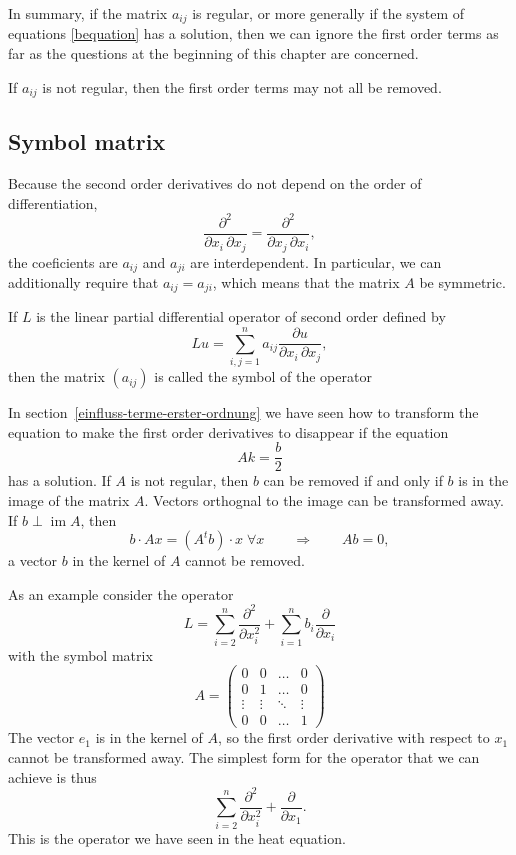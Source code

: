 In summary, if the matrix $a_{ij}$ is regular, or more generally if the
system of equations \eqref{bequation} has a solution, then we can
ignore the first order terms as far as the questions at the beginning
of this chapter are concerned.

If $a_{ij}$ is not regular, then the first order terms may not all
be removed.

\subsection{Symbol matrix}
Because the second order derivatives do not depend on the order
of differentiation,
\[
\frac{\partial^2}{\partial x_i\,\partial x_j}
=
\frac{\partial^2}{\partial x_j\,\partial x_i},
\]
the coeficients are 
$a_{ij}$ and $a_{ji}$ are interdependent.
In particular, we can additionally require that $a_{ij}=a_{ji}$,
which means that the matrix $A$ be symmetric.

\begin{definition}
If $L$ is the linear partial differential operator of second order
defined by
\[
Lu=\sum_{i,j=1}^na_{ij}\frac{\partial u}{\partial x_i\,\partial x_j},
\]
then the matrix $(a_{ij})$ is called the symbol of the operator
\end{definition}

In section~\ref{einfluss-terme-erster-ordnung} we have seen how to
transform the equation to make the first order derivatives to
disappear if the equation
\[
Ak=\frac{b}2
\]
has a solution.
If $A$ is not regular, then $b$ can be removed if and only if $b$ is in 
the image of the matrix $A$.
Vectors orthognal to the image can be transformed away.
If $b\perp \operatorname{im} A$, then 
\[
b\cdot Ax=(A^tb)\cdot x\;\forall x
\qquad\Rightarrow\qquad
Ab=0,
\]
a vector $b$ in the kernel of $A$ cannot be removed.

\begin{beispiel}
As an example consider the operator
\[
L
=
\sum_{i=2}^n\frac{\partial^2}{\partial x_i^2}
+
\sum_{i=1}^nb_i\frac{\partial}{\partial x_i}
\]
with the symbol matrix
\[
A=\begin{pmatrix}
      0&      0& \dots&0\\
      0&      1& \dots&0\\
\vdots &\vdots &\ddots&\vdots\\
      0&      0&\dots &1
\end{pmatrix}
\]
The vector $e_1$ is in the kernel of $A$, so the first order derivative
with respect to $x_1$ cannot be transformed away.
The simplest form for the operator that we can achieve is thus
\[
\sum_{i=2}^n\frac{\partial^2}{\partial x_i^2}
+
\frac{\partial}{\partial x_1}.
\]
This is the operator we have seen in the heat equation.
\end{beispiel}

